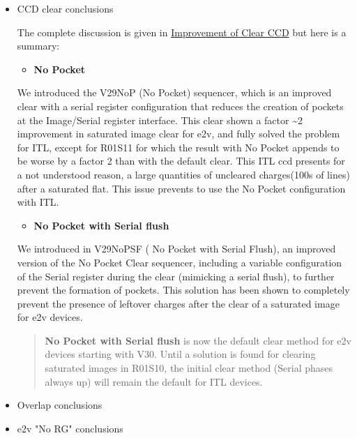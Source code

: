 \begin{itemize}
\item
  CCD clear conclusions

  The complete discussion is given in
  \href{https://sitcomtn-148.lsst.io/\#serialRemnants}{Improvement of
  Clear CCD} but here is a summary:

  \begin{itemize}
  \tightlist
  \item
    \textbf{No Pocket}
  \end{itemize}

  We introduced the V29\label{nop}{NoP} (No Pocket)
  sequencer, which is an improved clear with a serial register
  configuration that reduces the creation of pockets at the Image/Serial
  register interface. This clear shown a factor \textasciitilde2
  improvement in saturated image clear for e2v, and fully solved the
  problem for ITL, except for R01\label{s11}{S11} for
  which the result with No Pocket appends to be worse by a factor 2 than
  with the default clear. This ITL ccd presents for a not understood
  reason, a large quantities of uncleared charges(100\textquotesingle s
  of lines) after a saturated flat. This issue prevents to use the No
  Pocket configuration with ITL.

  \begin{itemize}
  \tightlist
  \item
    \textbf{No Pocket with Serial flush}
  \end{itemize}

  We introduced in V29\label{nopsf}{NoPSF} ( No Pocket
  with Serial Flush), an improved version of the No Pocket Clear
  sequencer, including a variable configuration of the Serial register
  during the clear (mimicking a serial flush), to further prevent the
  formation of pockets. This solution has been shown to completely
  prevent the presence of leftover charges after the clear of a
  saturated image for e2v devices.

  \begin{quote}
  \textbf{No Pocket with Serial flush} is now the default clear method
  for e2v devices starting with V30. Until a solution is found for
  clearing saturated images in R01\label{s10}{S10}, the
  initial clear method (Serial phases always up) will remain the default
  for ITL devices.
  \end{quote}
\item
  Overlap conclusions
\item
  e2v "No RG" conclusions
\end{itemize}

